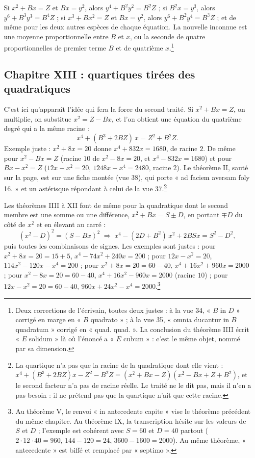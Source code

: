 \documentclass[11pt,a4paper]{article}
\begin{document}
Si $x^2 + Bx = Z$ et $Bx = y^2$, alors $y^4 + B^2y^2 = B^2Z$ ; si $B^2x = y^3$,
alors $y^6 + B^3y^3 = B^4Z$ ; si $x^3 + Bx^2 = Z$ et $Bx = y^2$, alors
$y^6 + B^2y^4 = B^3Z$ ; et de même pour les deux autres espèces de chaque
équation. La nouvelle inconnue est une moyenne proportionnelle entre $B$ et
$x$, ou la seconde de quatre proportionnelles de premier terme $B$ et de
quatrième $x$.\footnote{Deux corrections de l'écrivain, toutes deux justes : à la
vue 34, « $B$ in $D$ » corrigé en marge en « $B$ quadrato » ; à la vue 35,
« omnia ducantur in $B$ quadratum » corrigé en « quad. quad. ». La conclusion
du théorème IIII écrit « $E$ solidum » là où l'énoncé a « $E$ cubum » : c'est
le même objet, nommé par sa dimension.}

\subsection*{Chapitre XIII : quartiques tirées des quadratiques}

C'est ici qu'apparaît l'idée qui fera la force du second traité. Si
$x^2 + Bx = Z$, on multiplie, on substitue $x^2 = Z - Bx$, et l'on obtient une
équation du quatrième degré qui a la même racine :
\[ x^4 + (B^3 + 2BZ)\,x = Z^2 + B^2Z . \]
Exemple juste : $x^2 + 8x = 20$ donne $x^4 + 832x = 1680$, de racine $2$. De même
pour $x^2 - Bx = Z$ (racine $10$ de $x^2 - 8x = 20$, et $x^4 - 832x = 1680$) et
pour $Bx - x^2 = Z$ ($12x - x^2 = 20$, $1248x - x^4 = 2480$, racine $2$).
Le théorème II, sauté sur la page, est sur une fiche montée (vue 38), qui porte
« ad faciem aversam foly 16. » et un astérisque répondant à celui de la
vue 37.\footnote{La quartique n'a pas que la racine de la quadratique dont elle
vient : $x^4 + (B^3 + 2BZ)x - Z^2 - B^2Z = (x^2 + Bx - Z)(x^2 - Bx + Z + B^2)$, et
le second facteur n'a pas de racine réelle. Le traité ne le dit pas, mais il
n'en a pas besoin : il ne prétend pas que la quartique n'ait que cette racine.}

Les théorèmes IIII à XII font de même pour la quadratique dont le second membre
est une somme ou une différence, $x^2 + Bx = S \pm D$, en portant $\mp D$ du côté de
$x^2$ et en élevant au carré :
\[ (x^2 - D)^2 = (S - Bx)^2 \;\Longrightarrow\;
   x^4 - (2D + B^2)\,x^2 + 2BSx = S^2 - D^2 , \]
puis toutes les combinaisons de signes. Les exemples sont justes : pour
$x^2 + 8x = 20 = 15 + 5$, $x^4 - 74x^2 + 240x = 200$ ; pour $12x - x^2 = 20$,
$114x^2 - 120x - x^4 = 200$ ; pour $x^2 + 8x = 20 = 60 - 40$,
$x^4 + 16x^2 + 960x = 2000$ ; pour $x^2 - 8x = 20 = 60 - 40$,
$x^4 + 16x^2 - 960x = 2000$ (racine $10$) ; pour $12x - x^2 = 20 = 60 - 40$,
$960x + 24x^2 - x^4 = 2000$.\footnote{Au théorème V, le renvoi « in antecedente
capite » vise le théorème précédent du même chapitre. Au théorème IX, la
transcription hésite sur les valeurs de $S$ et $D$ ; l'exemple est cohérent avec
$S = 60$ et $D = 40$ partout ($2 \cdot 12 \cdot 40 = 960$, $144 - 120 = 24$,
$3600 - 1600 = 2000$). Au même théorème, « antecedente » est biffé et remplacé
par « septimo ».}
\end{document}
